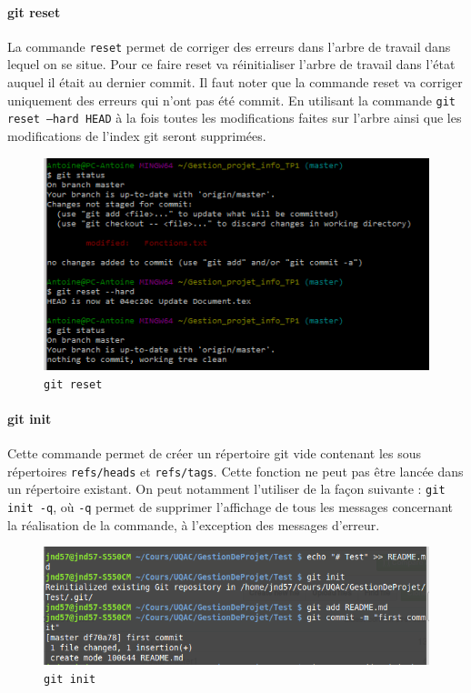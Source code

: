 \documentclass[11pt,canadien]{article}
\begin{document}
\paragraph{git reset}La commande \texttt{reset} permet de corriger des erreurs dans l'arbre de travail dans lequel on se situe. Pour ce faire reset va réinitialiser l'arbre de travail dans l'état auquel il était au dernier commit. Il faut noter que la commande reset va corriger uniquement des erreurs qui n'ont pas été commit. En utilisant la commande \texttt{git reset --hard HEAD} à la fois toutes les modifications faites sur l'arbre ainsi que les modifications de l'index git seront supprimées.
\begin{figure}
	\centering
	\includegraphics{images/git_reset.png}
	\caption{\texttt{git reset}}
	\label{fig:git_reset}
\end{figure}

\paragraph{git init}Cette commande permet de créer un répertoire git vide contenant les sous répertoires \texttt{refs/heads} et \texttt{refs/tags}. Cette fonction ne peut pas être lancée dans un répertoire existant. On peut notamment l’utiliser de la façon suivante : \texttt{git init -q}, où \texttt{-q} permet de supprimer l’affichage de tous les messages concernant la réalisation de la commande, à l’exception des messages d’erreur.
\begin{figure}
	\centering
	\includegraphics[width=\textwidth]{images/git-init.png}
	\caption{\texttt{git init}}
	\label{fig:git_init}
\end{figure}
\end{document}
